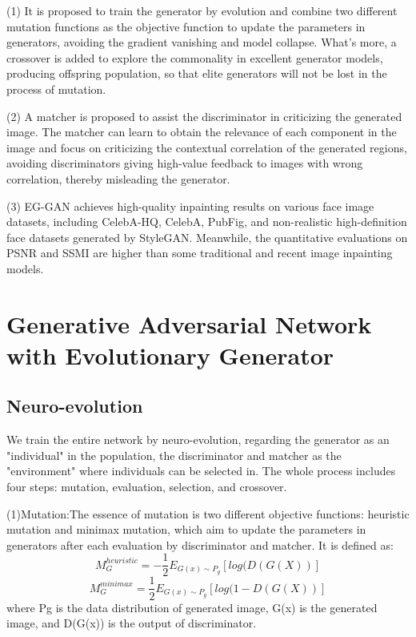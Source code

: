 \documentclass[journal]{IEEEtran}
\begin{document}
(1) It is proposed to train the generator by evolution and combine two different mutation functions as the objective function to update the parameters in generators, avoiding the gradient vanishing and model collapse. What's more, a crossover is added to explore the commonality in excellent generator models, producing offspring population, so that elite generators will not be lost in the process of mutation.

(2) A matcher is proposed to assist the discriminator in criticizing the generated image. The matcher can learn to obtain the relevance of each component in the image and focus on criticizing the contextual correlation of the generated regions, avoiding discriminators giving high-value feedback to images with wrong correlation, thereby misleading the generator.

(3) EG-GAN achieves high-quality inpainting results on various face image datasets, including CelebA-HQ, CelebA, PubFig, and non-realistic high-definition face datasets generated by StyleGAN. Meanwhile, the quantitative evaluations on PSNR and SSMI are higher than some traditional and recent image inpainting models.

\section{Generative Adversarial Network with Evolutionary Generator}
\subsection{Neuro-evolution}
We train the entire network by neuro-evolution, regarding the generator as an "individual" in the population, the discriminator and matcher as the "environment" where individuals can be selected in. The whole process includes four steps: mutation, evaluation, selection, and crossover.

(1)Mutation:The essence of mutation is two different objective functions: heuristic mutation and minimax mutation\cite{wang2019evolutionary}, which aim to update the parameters in generators after each evaluation by discriminator and matcher. It is defined as:
    \begin{equation}
    M_G^{heuristic}=-\frac{1}{2}E_{G(x)\sim P_g}[log(D(G(X))]
    \end{equation}
    \begin{equation}
    M_G^{minimax}=\frac{1}{2}E_{G(x)\sim P_g}[log(1-D(G(X))]
    \end{equation}
where Pg is the data distribution of generated image, G(x) is the generated image, and D(G(x)) is the output of discriminator.
\end{document}
